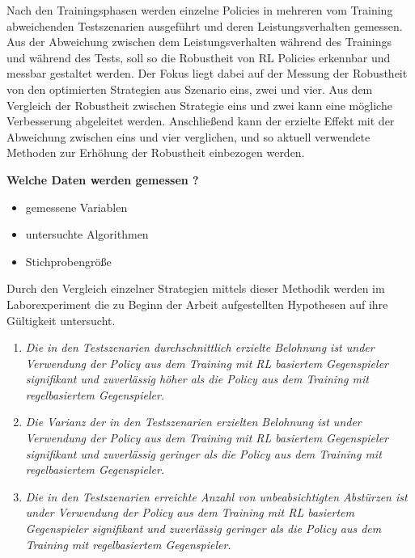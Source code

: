 Nach den Trainingsphasen werden einzelne Policies in mehreren vom Training abweichenden Testszenarien ausgeführt und deren Leistungsverhalten gemessen.
Aus der Abweichung zwischen dem Leistungsverhalten während des Trainings und während des Tests, soll so die Robustheit von RL Policies erkennbar und messbar gestaltet werden.
Der Fokus liegt dabei auf der Messung der Robustheit von den optimierten Strategien aus Szenario eins, zwei und vier.
Aus dem Vergleich der Robustheit zwischen Strategie eins und zwei kann eine mögliche Verbesserung abgeleitet werden.
Anschließend kann der erzielte Effekt mit der Abweichung zwischen eins und vier verglichen, und so aktuell verwendete Methoden zur Erhöhung der Robustheit einbezogen werden.

\textbf{Welche Daten werden gemessen ?}
\begin{itemize}
    \item gemessene Variablen
    \item untersuchte Algorithmen
    \item Stichprobengröße
\end{itemize}

Durch den Vergleich einzelner Strategien mittels dieser Methodik werden im Laborexperiment die zu Beginn der Arbeit aufgestellten Hypothesen auf ihre Gültigkeit untersucht.
\begin{enumerate}
    \item \textit{Die in den Testszenarien durchschnittlich erzielte Belohnung ist under Verwendung der Policy aus dem Training mit RL basiertem Gegenspieler signifikant und zuverlässig höher als die Policy aus dem Training mit regelbasiertem Gegenspieler.}
    \item \textit{Die Varianz der in den Testszenarien erzielten Belohnung ist under Verwendung der Policy aus dem Training mit RL basiertem Gegenspieler signifikant und zuverlässig geringer als die Policy aus dem Training mit regelbasiertem Gegenspieler.}
    \item \textit{Die in den Testszenarien erreichte Anzahl von unbeabsichtigten Abstürzen ist under Verwendung der Policy aus dem Training mit RL basiertem Gegenspieler signifikant und zuverlässig geringer als die Policy aus dem Training mit regelbasiertem Gegenspieler.}
\end{enumerate}

